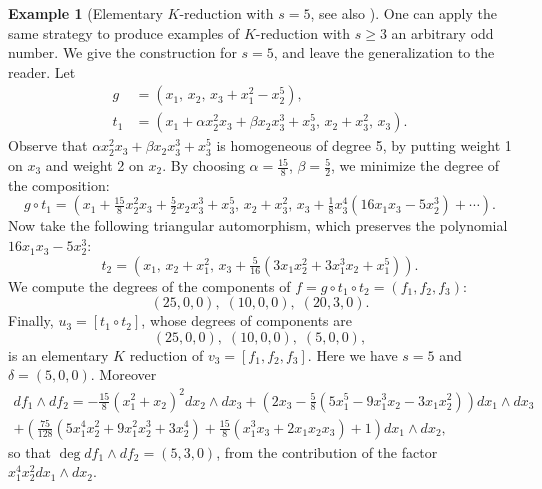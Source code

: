 \documentclass[reqno,oneside,11pt]{amsart}
\theoremstyle{plain}
\theoremstyle{definition}
\newtheorem{example}[theorem]{Example}
\renewcommand{\ge}{\geqslant}
\begin{document}
\begin{example}[Elementary $K$-reduction with $s = 5$, {see also \cite{Ku:type1}}] \label{exple:s=5}
One can apply the same strategy to produce examples of $K$-reduction with $s \ge 3$ an arbitrary odd number.
We give the construction for $s = 5$, and leave the generalization to the
reader.
Let
\begin{align*}
g &= (x_1,\, x_2,\, x_3 + x_1^2 - x_2^5), \\
t_1 &= (x_1 + \alpha x_2^2 x_3 + \beta x_2 x_3^3 + x_3^5,\, x_2 + x_3^2,\, x_3).
\end{align*}
Observe that $\alpha x_2^2 x_3 + \beta x_2 x_3^3 + x_3^5$ is homogeneous of degree 5, by putting weight 1 on $x_3$ and weight 2 on $x_2$.
By choosing $\alpha = \tfrac{15}{8}$, $\beta = \tfrac{5}{2}$, we minimize the degree of the composition:
$$ g \circ t_1 = \left(
x_1 + \tfrac{15}{8} x_2^2 x_3 + \tfrac{5}{2} x_2 x_3^3 + x_3^5,\, x_2 + x_3^2,\,
x_3 + \tfrac{1}{8}x_3^4(16x_1x_3 - 5 x_2^3) + \cdots \right).$$
Now take the following triangular automorphism, which preserves the polynomial $16x_1x_3 - 5 x_2^3$:
$$ t_2 = \left(x_1,\, x_2 + x_1^2,\, x_3 + \tfrac{5}{16}(3x_1x_2^2 + 3x_1^3x_2 + x_1^5)\right).$$
We compute the degrees of the components of $f = g \circ t_1 \circ t_2 = (f_1, f_2, f_3)$:
$$(25,0,0), \; (10,0,0), \; (20,3,0).$$
Finally, $u_3 = [t_1 \circ t_2]$, whose degrees of components are
$$(25,0,0), \; (10,0,0), \; (5,0,0),$$
is an elementary $K$ reduction of $v_3 = [f_1, f_2, f_3]$.
Here we have $s = 5$ and $\delta = (5,0,0)$.
Moreover
\begin{multline*}
df_1 \wedge df_2 = -\tfrac{15}8 \left( x_1^2 + x_2 \right)^2 dx_2 \wedge dx_3
+ \left( 2x_3- \tfrac{5}{8}(5 x_1^5 - 9 x_1^3x_2 - 3 x_1x_2^2)  \right) dx_1 \wedge dx_3 \\
+ \left( \tfrac{75}{128}(5 x_1^4 x_2^2 + 9 x_1^2 x_2^3 + 3 x_2^4) + \tfrac{15}8 ( x_1^3x_3 + 2 x_1 x_2 x_3) + 1 \right)dx_1 \wedge dx_2,
\end{multline*}
so that $\deg df_1 \wedge df_2 = (5,3,0)$, from the contribution of the factor $x_1^4x_2^2 dx_1 \wedge dx_2$.
\end{example}
\end{document}
